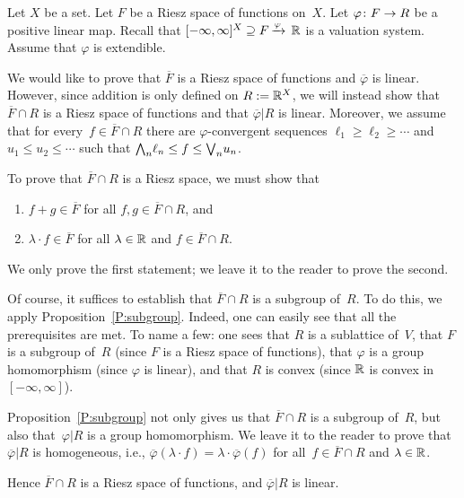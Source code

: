 %
%
\begin{ex}
\label{E:riesz-space-ext}
Let $X$ be a set.
Let $F$ be a Riesz space of functions on~$X$.
Let $\varphi\colon F\rightarrow R$ be a positive linear map.
Recall that $[-\infty,\infty]^X \supseteq F\,\smash{\xrightarrow{\varphi}\,\mathbb{R}}$
is a valuation system.
Assume that $\varphi$ is extendible.

We would like to prove that $\overline F$ is a Riesz space of functions
and $\overline\varphi$ is linear.
However, since addition is only defined on $R:=\mathbb{R}^X$,
we will instead show that
$\overline F\cap R$ is a Riesz space
of functions and that $\overline\varphi|R$ is linear.
Moreover,
we assume
that for every~$f\in\overline F \cap R$
there are $\varphi$-convergent sequences
 $\ell_1 \geq \ell_2 \geq \dotsb$
and $u_1 \leq u_2 \leq \dotsb$
such that $\textstyle{\bigwedge}_n \ell_n \leq f \leq \textstyle{\bigvee}_n u_n$.

To prove that $\overline F \cap R$ is a Riesz space,
we must show that
\begin{enumerate}
\item
 $f+g\in \overline F$ 
for all $f,g\in \overline F \cap R$, and

\item
$\lambda \cdot f\in \overline F$
for all $\lambda\in \mathbb{R}$ and $f\in \overline F\cap R$.
\end{enumerate}
We only prove the first statement;
we leave it to the reader to prove the second.

Of course,
it suffices to establish that $\overline F\cap R$
is a subgroup of~$R$.
To do this,
we apply Proposition~\ref{P:subgroup}.
Indeed, one can easily
see that all the prerequisites are met.
To name a few: one sees that
$R$ is a sublattice of~$V$,
that $F$ is a subgroup of~$R$ (since $F$ is a Riesz space of functions),
that $\varphi$ is a group homomorphism (since $\varphi$ is linear),
and that $R$ is convex (since $\mathbb{R}$ is convex in $[-\infty,\infty]$).

Proposition~\ref{P:subgroup} not only gives us that $\overline F \cap R$
is a subgroup of~$R$, but
also that~$\varphi|R$ is a group homomorphism.
We leave it to the reader to prove that
$\overline\varphi|R$ is homogeneous,
i.e., $\overline\varphi(\lambda\cdot f) = \lambda \cdot \overline\varphi(f)$
for all~$f\in \overline F \cap R$ and $\lambda \in \mathbb{R}$.

Hence $\overline F\cap R$
is a Riesz space of functions, and $\overline \varphi |R$ is linear.
\end{ex}

